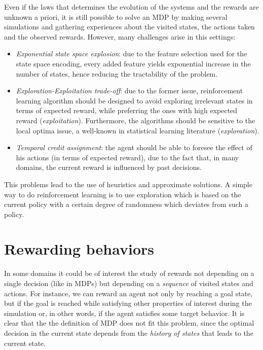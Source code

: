 \medskip
Even if the laws that determines the evolution of the systems and the rewards are unknown a priori, it is still possible to solve an MDP by making several simulations and gathering experiences about the visited states, the actions taken and the observed rewards. However, many challenges arise in this settings:
\begin{itemize}
	\item \emph{Exponential state space explosion}: due to the feature selection used for the state space encoding, every added feature yields exponential increase in the number of states, hence reducing the tractability of the problem.
	\item \emph{Exploration-Exploitation trade-off}: due to the former issue, reinforcement learning algorithm should be designed to avoid exploring irrelevant states in terms of expected reward, while preferring the ones with high expected reward (\emph{exploitation}). Furthermore, the algorithms should be sensitive to the local optima issue, a well-known in statistical learning literature (\emph{exploration}).
	\item \emph{Temporal credit assignment}: the agent should be able to foresee the effect of his actions (in terms of expected reward), due to the fact that, in many domains, the current reward is influenced by past decisions.
\end{itemize}

This problems lead to the use of heuristics and approximate solutions. A simple way to do reinforcement learning is to use exploration which is based on the current policy with a certain degree of randomness which deviates from such a policy.

\section{Rewarding behaviors}\label{sect:intro-rewarding-behaviors}
In some domains it could be of interest the study of rewards not depending on a single decision (like in MDPs) but depending on a \emph{sequence} of visited states and actions. For instance, we can reward an agent not only by reaching a goal state, but if the goal is reached while satisfying other properties of interest during the simulation or, in other words, if the agent satisfies some target behavior. It is clear that the the definition of MDP does not fit this problem, since the optimal decision in the current state depends from the \emph{history of states} that leads to the current state.

